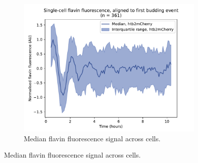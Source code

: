 \begin{figure}
\begin{subfigure}[htpb]{0.4\textwidth}
  \end{subfigure}%
  \begin{subfigure}[htpb]{0.4\textwidth}
   \centering
   \includegraphics[width=\textwidth]{htb2mCherry_26643_6}
   \caption{
    Median flavin fluorescence signal across cells.%
   }
   \label{fig:biology-highglc-sync-median}
  \end{subfigure}


\end{figure}

